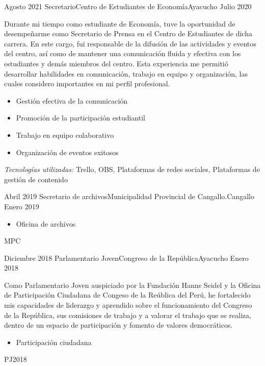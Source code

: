 \begin{experiences}
  \experience
  {Agosto 2021}    {Secretario}{Centro de Estudiantes de Economía}{Ayacucho}
  {Julio 2020}   {
    Durante mi tiempo como estudiante de Economía, tuve la oportunidad de desempeñarme como Secretario de Prensa en el Centro de Estudiantes de dicha carrera. En este cargo, fui responsable de la difusión de las actividades y eventos del centro, así como de mantener una comunicación fluida y efectiva con los estudiantes y demás miembros del centro. Esta experiencia me permitió desarrollar habilidades en comunicación, trabajo en equipo y organización, las cuales considero importantes en mi perfil profesional.
    \begin{itemize}
      \item Gestión efectiva de la comunicación
      \item Promoción de la participación estudiantil
      \item Trabajo en equipo colaborativo
      \item Organización de eventos exitosos
    \end{itemize}
  }
  {\footnotesize{\emph{Tecnologías utilizadas:} Trello, OBS, Plataformas de redes sociales, Plataformas de gestión de contenido}}
  \emptySeparator

  \experience
  {Abril 2019} {Secretario de archivos}{Municipalidad Provincial de Cangallo.}{Cangallo}
  {Enero 2019}    {
    \begin{itemize}
      \item Oficina de archivos
    \end{itemize}
  }
  {MPC}
  \emptySeparator

  \experience
  {Diciembre 2018}  {Parlamentario Joven}{Congreso de la República}{Ayacucho}
  {Enero 2018}   {
    Como Parlamentario Joven auspiciado por la Fundación Hanns Seidel y la Oficina de Participación Ciudadana de Congeso de la Reública del Perú, he fortalecido mis capacidades de liderazgo y aprendido sobre el funcionamiento del Congreso de la República, sus comisiones de trabajo y a valorar el trabajo que se realiza, dentro de un espacio de participación y fomento de valores democráticos.
    \begin{itemize}
      \item Participación ciudadana
    \end{itemize}
  }
  {PJ2018}

\end{experiences}





